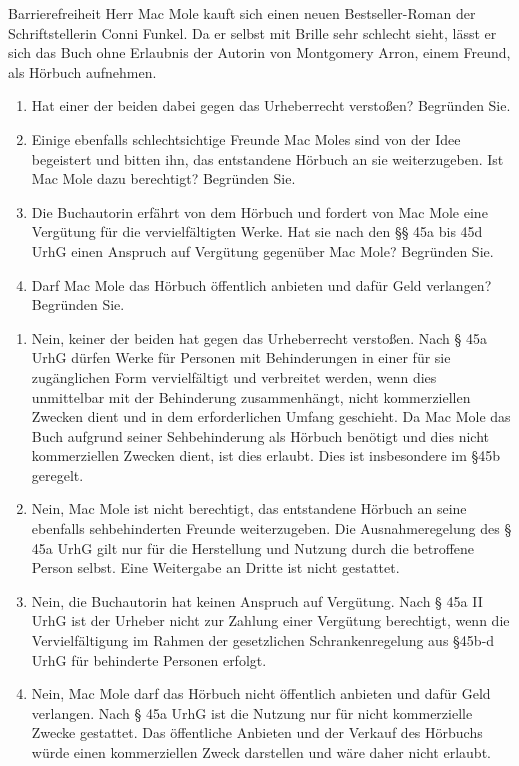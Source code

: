 \documentclass{article}
\begin{document}
\begin{exercise}{Barrierefreiheit}
  Herr Mac Mole kauft sich einen neuen Bestseller-Roman der Schriftstellerin Conni Funkel. Da er selbst mit Brille sehr schlecht sieht, lässt er sich das Buch ohne Erlaubnis der Autorin von Montgomery Arron, einem Freund, als Hörbuch aufnehmen.
  \begin{enumerate}
    \item Hat einer der beiden dabei gegen das Urheberrecht verstoßen? Begründen Sie.
    \item Einige ebenfalls schlechtsichtige Freunde Mac Moles sind von der Idee begeistert und bitten ihn, das entstandene Hörbuch an sie weiterzugeben. Ist Mac Mole dazu berechtigt? Begründen Sie.
    \item Die Buchautorin erfährt von dem Hörbuch und fordert von Mac Mole eine Vergütung für die vervielfältigten Werke. Hat sie nach den §§ 45a bis 45d UrhG einen Anspruch auf Vergütung gegenüber Mac Mole? Begründen Sie.
    \item Darf Mac Mole das Hörbuch öffentlich anbieten und dafür Geld verlangen? Begründen Sie.
  \end{enumerate}

  \begin{solution}
    \begin{enumerate}
      \item Nein, keiner der beiden hat gegen das Urheberrecht verstoßen. Nach § 45a UrhG dürfen Werke für Personen mit Behinderungen in einer für sie zugänglichen Form vervielfältigt und verbreitet werden, wenn dies unmittelbar mit der Behinderung zusammenhängt, nicht kommerziellen Zwecken dient und in dem erforderlichen Umfang geschieht. Da Mac Mole das Buch aufgrund seiner Sehbehinderung als Hörbuch benötigt und dies nicht kommerziellen Zwecken dient, ist dies erlaubt. Dies ist insbesondere im §45b geregelt.
      \item Nein, Mac Mole ist nicht berechtigt, das entstandene Hörbuch an seine ebenfalls sehbehinderten Freunde weiterzugeben. Die Ausnahmeregelung des § 45a UrhG gilt nur für die Herstellung und Nutzung durch die betroffene Person selbst. Eine Weitergabe an Dritte ist nicht gestattet.
      \item Nein, die Buchautorin hat keinen Anspruch auf Vergütung. Nach § 45a II UrhG ist der Urheber nicht zur Zahlung einer Vergütung berechtigt, wenn die Vervielfältigung im Rahmen der gesetzlichen Schrankenregelung aus §45b-d UrhG für behinderte Personen erfolgt.
      \item Nein, Mac Mole darf das Hörbuch nicht öffentlich anbieten und dafür Geld verlangen. Nach § 45a UrhG ist die Nutzung nur für nicht kommerzielle Zwecke gestattet. Das öffentliche Anbieten und der Verkauf des Hörbuchs würde einen kommerziellen Zweck darstellen und wäre daher nicht erlaubt.
    \end{enumerate}
  \end{solution}
\end{exercise}
\end{document}
